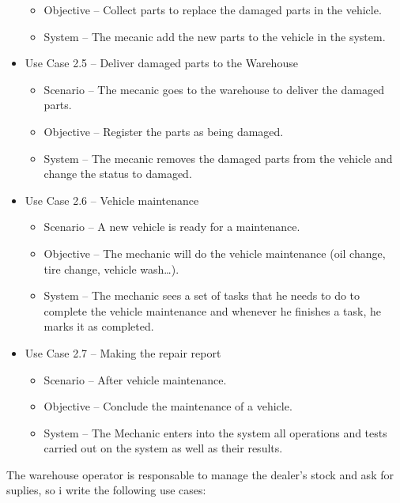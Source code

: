 \begin{itemize}
\begin{itemize}
      \item Objective – Collect parts to replace the damaged parts in the vehicle.
      \item System – The mecanic add the new parts to the vehicle in the system.
    \end{itemize}
    \item Use Case 2.5 – Deliver damaged parts to the Warehouse
    \begin{itemize}
      \item Scenario – The mecanic goes to the warehouse to deliver the damaged parts.
      \item Objective – Register the parts as being damaged.
      \item System – The mecanic removes the damaged parts from the vehicle and change the status to damaged.
    \end{itemize}
\item Use Case 2.6 – Vehicle maintenance
\begin{itemize}
  \item Scenario – A new vehicle is ready for a maintenance.
  \item Objective – The mechanic will do the vehicle maintenance (oil change, tire change, vehicle wash…).
  \item System – The mechanic sees a set of tasks that he needs to do to complete the vehicle maintenance and whenever he finishes a task, he marks it as completed.
\end{itemize}
\item Use Case 2.7 – Making the repair report
\begin{itemize}
  \item Scenario – After vehicle maintenance.
  \item Objective – Conclude the maintenance of a vehicle.
  \item System – The Mechanic enters into the system all operations and tests carried out on the system as well as their results.
\end{itemize}
\end{itemize}
\hfill \break

The warehouse operator is responsable to manage the dealer's stock and ask for suplies, so i write the following use cases:

